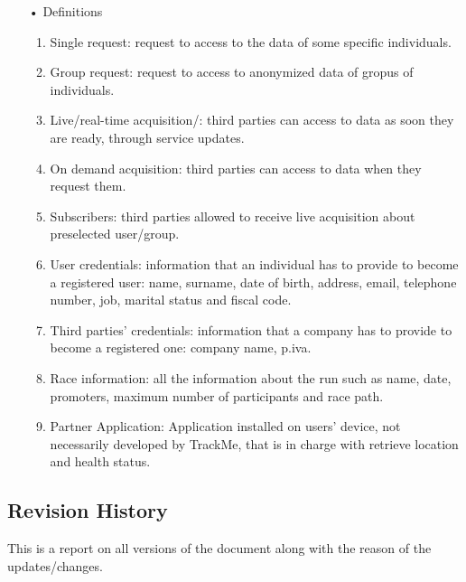 \begin{enumerate}
\item[•] {\Large Definitions}
	\begin{enumerate}
		\item Single request: request to access to the data of some specific  individuals.
		\item Group request: request to access to anonymized data of gropus of individuals.
		\item Live/real-time acquisition/: third parties can access to data as soon they are ready, 				through service updates.
		\item On demand acquisition: third parties can access to data when they request 				them.
		\item Subscribers: third parties allowed to receive live acquisition about 						preselected	user/group.
		\item User credentials: information that an individual has to provide to become a 				registered user: name, surname, date of birth, address, email, telephone
			number, job, marital status and fiscal code. 
		\item Third parties' credentials: information that a company has to provide to 					become a registered one: company name, p.iva.
		\item Race information: all the information about the run such as name, date, promoters, 				maximum number of participants and race path.
		\item Partner Application: Application installed on users' device, not necessarily developed by TrackMe, that is in charge with retrieve location and health status. 
	\end{enumerate}
\end{enumerate}
\subsection{Revision History}
This is a report on all versions of the document along with the reason of the updates/changes.

